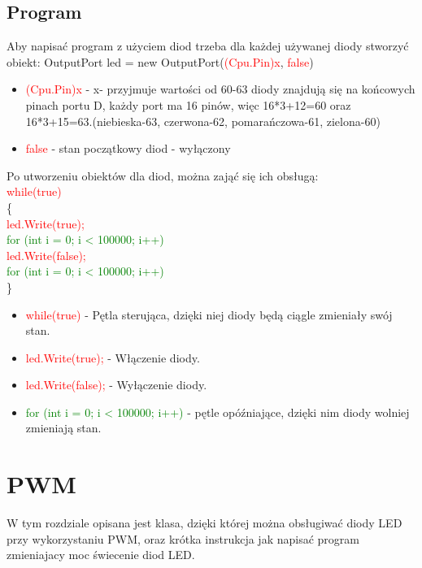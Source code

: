 \documentclass{article}
\begin{document}
\subsection{Program}
Aby napisać program z użyciem diod trzeba dla każdej używanej diody stworzyć obiekt:\newline \newline
OutputPort led = new OutputPort(\space \textcolor{red}{(Cpu.Pin)x},\space \textcolor{red}{ false})
\begin{itemize}
\item \textcolor{red}{(Cpu.Pin)x} - x- przyjmuje wartości od 60-63 diody znajdują się na \newline końcowych pinach portu D, każdy port ma 16 pinów, więc 16*3+12=60 oraz 16*3+15=63.(niebieska-63, czerwona-62, pomarańczowa-61, zielona-60)
\item \textcolor{red}{false} - stan początkowy diod - wyłączony
\end{itemize}
Po utworzeniu obiektów dla diod, można zająć się ich obsługą:
\\ \textcolor{red}{while(true)}\\
            \{\\
                \textcolor{red}{led.Write(true);}\\
                \textcolor{green}{for (int i = 0; i < 100000; i++) { }}\\
                \textcolor{red}{led.Write(false);}\\
                \textcolor{green}{for (int i = 0; i < 100000; i++) { }}\\
\}\\
\begin{itemize}
\item \textcolor{red}{while(true)} - Pętla sterująca, dzięki niej diody będą ciągle zmieniały swój stan.
\item \textcolor{red}{led.Write(true);} - Włączenie diody.
\item \textcolor{red}{led.Write(false);} - Wyłączenie diody.
\item \textcolor{green}{for (int i = 0; i < 100000; i++) { }} - pętle opóźniające, dzięki nim diody wolniej zmieniają stan.
\end{itemize}

\section{PWM}
W tym rozdziale opisana jest klasa, dzięki której można obsługiwać diody LED przy wykorzystaniu PWM, oraz krótka instrukcja jak napisać program zmieniajacy moc świecenie diod LED.
\end{document}
